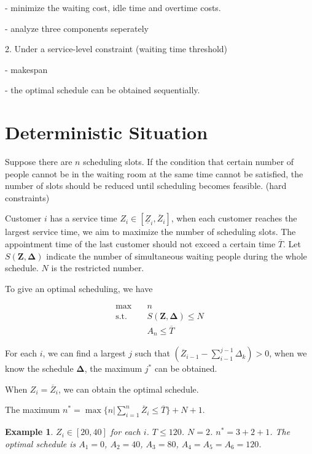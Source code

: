 \documentclass{article}
\newcommand{\Z}{\mathbf{Z}}
\newcommand{\D}{\bm{\Delta}}
\newtheorem{example}{Example}
\begin{document}
- minimize the waiting cost, idle time and overtime costs.

- analyze three components seperately


2. Under a service-level constraint (waiting time threshold)

- makespan

- the optimal schedule can be obtained sequentially.


\section{Deterministic Situation}

Suppose there are $n$ scheduling slots.
If the condition that certain number of people cannot be in the waiting room at the same time cannot be satisfied, the number of slots should be reduced until scheduling becomes feasible. (hard constraints)

Customer $i$ has a service time $Z_{i} \in [\underline{Z}_{i}, \overline{Z}_{i}]$, when each customer reaches the largest service time, we aim to maximize the number of scheduling slots. The appointment time of the last customer should not exceed a certain time $\overline{T}$. Let $S(\Z, \D)$ indicate the number of simultaneous waiting people during the whole schedule. $N$ is the restricted number.

To give an optimal scheduling, we have 

\begin{equation}\label{deterministic_model}
    \begin{aligned}
        \max \quad & n \\
        \mbox{s.t.} \quad & S(\Z, \D) \leq N \\
        & A_{n} \leq \overline{T}
    \end{aligned}
\end{equation}

For each $i$, we can find a largest $j$ such that $(\overline{Z}_{i-1}- \sum_{i-1}^{j-1} \Delta_{k})> 0$, when we know the schedule $\D$, the maximum $j^{*}$ can be obtained.


When $Z_{i} = \overline{Z}_{i}$, we can obtain the optimal schedule.

The maximum $n^{*} = \max\{n|\sum_{i=1}^{n} \overline{Z}_{i} \leq \overline{T}\} + N +1$.

\begin{example}
    $Z_{i} \in [20, 40]$ for each $i$. $T \leq 120$. $N =2$. $n^{*} = 3 + 2 +1$. The optimal schedule is $A_{1} = 0$, $A_2 = 40$, $A_3 = 80$, $A_4 =A_5 = A_6 = 120$.
\end{example}
\end{document}
